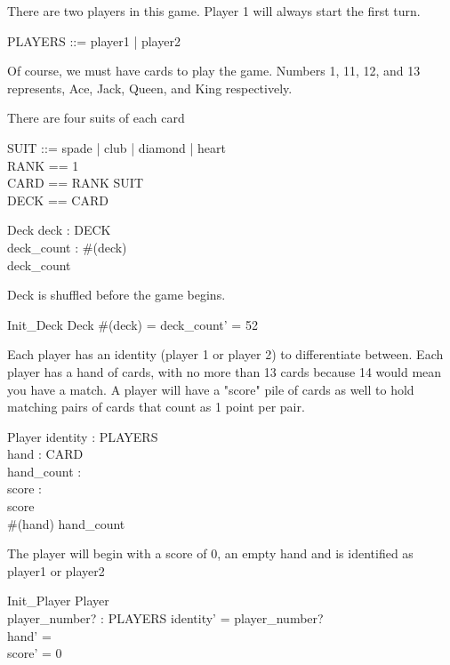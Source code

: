\documentclass{article}
\begin{document}
There are two players in this game. Player 1 will always start the first turn.
\begin{zed} 
    PLAYERS ::= player1 | player2\\
\end{zed}

Of course, we must have cards to play the game.
Numbers 1, 11, 12, and 13 represents, Ace, Jack, Queen, and King respectively.

There are four suits of each card
\begin{zed}
    SUIT ::= spade | club | diamond | heart \\
    RANK == 1 \\
    CARD == RANK \cross SUIT \\
    DECK == \power CARD
\end{zed}

\begin{schema}{Deck}
    deck : DECK \\
    deck\_count : \nat
    \where
    \#(deck)  \\  
    deck\_count 
\end{schema}

Deck is shuffled before the game begins.
\begin{schema}{Init\_Deck}
    \Delta Deck
    \where
    \#(deck) = deck\_count' = 52 \\
\end{schema}

Each player has an identity (player 1 or player 2) to
differentiate between. Each player has a hand of cards, with
no more than 13 cards because 14 would mean you have a match.
A player will have a "score" pile of cards as well to hold
matching pairs of cards that count as 1 point per pair.

\begin{schema}{Player}
    identity : PLAYERS \\
    hand : \power CARD \\
    hand\_count : \nat \\
    score : \nat \\
    \where
    score  \\
    \#(hand)  \land hand\_count  \\
\end{schema}

The player will begin with a score of 0, an empty hand
and is identified as player1 or player2
\begin{schema}{Init\_Player}
    \Delta Player \\
    player\_number? : PLAYERS
    \where
    identity' = player\_number?\\
    hand' = \emptyset \\
    score' = 0 \\
\end{schema}
\end{document}
